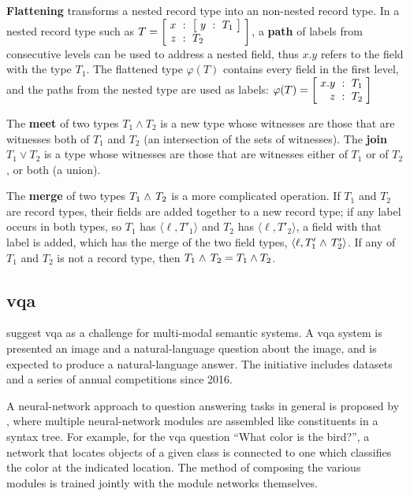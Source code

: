 \textbf{Flattening} transforms a nested record type into an non-nested record type.
In a nested record type such as $T = \rec{x &:& \rec{y &:& T_1} \\ z &:& T_2}$, a \textbf{path} of labels from consecutive levels can be used to address a nested field, thus $x.y$ refers to the field with the type $T_1$.
The flattened type $\varphi(T)$ contains every field in the first level, and the paths from the nested type are used as labels:
$\varphi(T) = \rec{x.y &:& T_1 \\ z &:& T_2}$

The \textbf{meet} of two types $T_1 \wedge T_2$ is a new type whose witnesses are those that are witnesses both of $T_1$ and $T_2$ (an intersection of the sets of witnesses).
The \textbf{join} $T_1 \vee T_2$ is a type whose witnesses are those that are witnesses either of $T_1$ or of $T_2$, or both (a union).

The \textbf{merge} of two types $T_1 \mathrel{\wedge_{\mkern-10mu\cdot\mkern6mu}} T_2$ is a more complicated operation.
If $T_1$ and $T_2$ are record types, their fields are added together to a new record type;
if any label occurs in both types, so $T_1$ has $\langle \ell, T'_1\rangle$ and $T_2$ has $\langle \ell, T'_2\rangle$, a field with that label is added, which has the merge of the two field types, $\langle \ell, T'_1 \mathrel{\wedge_{\mkern-10mu\cdot\mkern6mu}} T'_2\rangle$.
If any of $T_1$ and $T_2$ is not a record type, then $T_1 \mathrel{\wedge_{\mkern-10mu\cdot\mkern6mu}} T_2 = T_1 \wedge T_2$.



\subsection{\Acrfull{vqa}}

\cite{AgrawalVQAVisualQuestion2015} suggest \gls{vqa} as a challenge for multi-modal semantic systems.
A \gls{vqa} system is presented an image and a natural-language question about the image, and is expected to produce a natural-language answer.
The initiative includes datasets and a series of annual competitions since 2016.

A neural-network approach to question answering tasks in general is proposed by \cite{AndreasLearningComposeNeural2016}, where multiple neural-network modules are assembled like constituents in a syntax tree.
For example, for the \gls{vqa} question ``What color is the bird?'', a network that locates objects of a given class is connected to one which classifies the color at the indicated location.
The method of composing the various modules is trained jointly with the module networks themselves.


